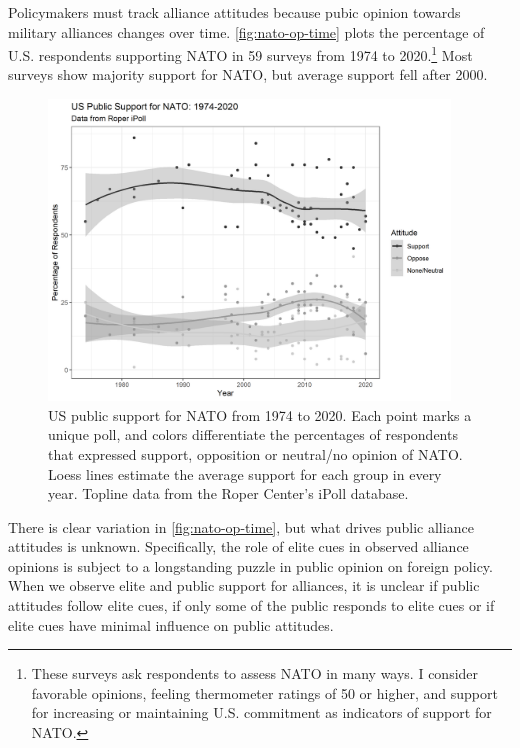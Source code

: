 \documentclass[12pt]{article}
\begin{document}
Policymakers must track alliance attitudes because pubic opinion towards military alliances changes over time. 
\autoref{fig:nato-op-time} plots the percentage of U.S. respondents supporting NATO in 59 surveys from 1974 to 2020.\footnote{These surveys ask respondents to assess NATO in many ways. I consider favorable opinions, feeling thermometer ratings of 50 or higher, and support for increasing or maintaining U.S. commitment as indicators of support for NATO.} 
Most surveys show majority support for NATO, but average support fell after 2000.  


\begin{figure}
	\centering
		\includegraphics[width=0.95\textwidth]{../figures/nato-op-time.png}
	\caption{US public support for NATO from 1974 to 2020. Each point marks a unique poll, and colors differentiate the percentages of respondents that expressed support, opposition or neutral/no opinion of NATO. Loess lines estimate the average support for each group in every year. Topline data from the Roper Center's iPoll database.}
	\label{fig:nato-op-time}
\end{figure}


There is clear variation in \autoref{fig:nato-op-time}, but what drives public alliance attitudes is unknown. 
Specifically, the role of elite cues in observed alliance opinions is subject to a longstanding puzzle in public opinion on foreign policy.
When we observe elite and public support for alliances, it is unclear if public attitudes follow elite cues, if only some of the public responds to elite cues or if elite cues have minimal influence on public attitudes. 
\end{document}

